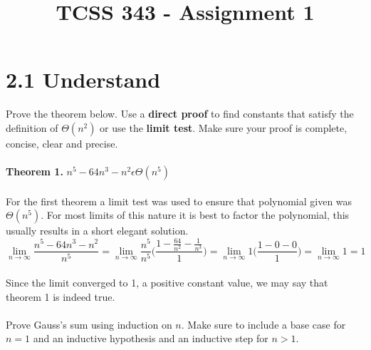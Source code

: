 \documentclass[12pt]{article}
\begin{document}
\title{TCSS 343 - Assignment 1}
\maketitle


\section{2.1 Understand}

Prove the theorem below. 
Use a \textbf{direct proof} to find constants that satisfy the definition of \begin{math}\Theta(n^2)\end{math} or use the \textbf{limit test}.  
Make sure your proof is complete, concise, clear and precise.
\\\\\textbf{Theorem 1.} 
\begin{math}n^5-64n^3-n^2 \epsilon \Theta(n^5)\end{math}
\\\\For the first theorem a limit test was used to ensure that polynomial given was \begin{math}\Theta(n^5)\end{math}. For most limits of 
this nature it is best to factor the polynomial, this usually results in a short elegant solution. 
\[ \lim_{n \to \infty}  \frac{n^5-64n^3-n^2}{n^5} = \lim_{n \to \infty} \frac{n^5}{n^5}\Bigg(\frac{1-\frac{64}{n^2}-\frac{1}{n^3}}{1}\Bigg) = \lim_{n \to \infty} 1\Bigg(\frac{1-0-0}{1}\Bigg) = \lim_{n \to \infty} 1 = 1\]
\\Since the limit converged to 1, a positive constant value, we may say that theorem 1 is indeed true.\\\\
\noindent Prove Gauss’s sum using induction on \begin{math}n\end{math}. Make sure to include a base case for \begin{math} n = 1\end{math} and an inductive hypothesis and an inductive step for \begin{math}n > 1\end{math}.\\
\end{document}
